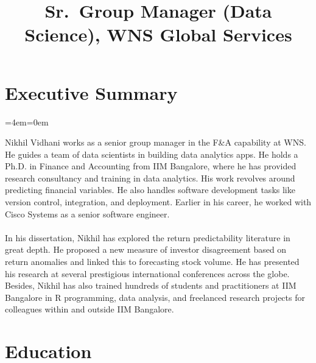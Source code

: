 \documentclass[11pt,a4paper,]{moderncv}
\title{Sr.~Group Manager (Data Science), WNS Global Services}
\begin{document}
\makecvtitle



\newenvironment{smallblockquote}{%
  \par%
  \medskip
  \leftskip=2em\rightskip=0em%
  \noindent\ignorespaces}{%
  \par\medskip}

\newenvironment{blockquote}{%
  \par%
  \medskip
  \leftskip=4em\rightskip=0em%
  \noindent\ignorespaces}{%
  \par\medskip}

\hypertarget{executive-summary}{%
\section{Executive Summary}\label{executive-summary}}

\begingroup
%
  \par%
  \medskip
  \leftskip=4em\rightskip=0em%
  \noindent\ignorespaces

Nikhil Vidhani works as a senior group manager in the F\&A capability at WNS. He guides a team of data scientists in building data analytics apps. He holds a Ph.D. in Finance and Accounting from IIM Bangalore, where he has provided research consultancy and training in data analytics. His work revolves around predicting financial variables. He also handles software development tasks like version control, integration, and deployment. Earlier in his career, he worked with Cisco Systems as a senior software engineer.\\
\\
In his dissertation, Nikhil has explored the return predictability literature in great depth. He proposed a new measure of investor disagreement based on return anomalies and linked this to forecasting stock volume. He has presented his research at several prestigious international conferences across the globe. Besides, Nikhil has also trained hundreds of students and practitioners at IIM Bangalore in R programming, data analysis, and freelanced research projects for colleagues within and outside IIM Bangalore.

%
  \par\medskip
\endgroup

\hypertarget{education}{%
\section{Education}\label{education}}
\end{document}
